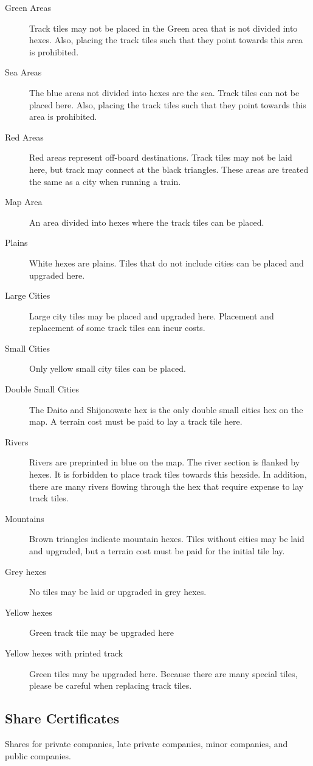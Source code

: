 \documentclass{article}
\begin{document}
\begin{CJK}{UTF8}{min}
\begin{multicols}{2}
\begin{description}
\item[Green Areas] Track tiles may not be placed in the Green area
  that is not divided into hexes. Also, placing the track tiles such
  that they point towards this area is prohibited.
\item[Sea Areas] The blue areas not divided into hexes are the
  sea. Track tiles can not be placed here. Also, placing the track
  tiles such that they point towards this area is prohibited.
\item[Red Areas] Red areas represent off-board destinations. Track
  tiles may not be laid here, but track may connect at the black
  triangles. These areas are treated the same as a city when running a
  train.
\item[Map Area] An area divided into hexes where the track
  tiles can be placed.
\item[Plains] White hexes are plains. Tiles that do not include cities
  can be placed and upgraded here.
\item[Large Cities] Large city tiles may be placed and upgraded
  here. Placement and replacement of some track tiles can incur costs.
\item[Small Cities] Only yellow small city tiles can be placed.
\item[Double Small Cities] The Daito and Shijonowate hex is the only
  double small cities hex on the map. A terrain cost must be paid to
  lay a track tile here.
\item[Rivers] Rivers are preprinted in blue on the map. The river
  section is flanked by hexes. It is forbidden to place track tiles
  towards this hexside. In addition, there are many rivers flowing
  through the hex that require expense to lay track tiles.
\item[Mountains] Brown triangles indicate mountain hexes. Tiles
  without cities may be laid and upgraded, but a terrain cost must be
  paid for the initial tile lay.
\item[Grey hexes] No tiles may be laid or upgraded in grey hexes.
\item[Yellow hexes] Green track tile may be upgraded here
\item[Yellow hexes with printed track] Green tiles may be upgraded
  here. Because there are many special tiles, please be careful when
  replacing track tiles.
\end{description}


\subsection{Share Certificates}
Shares for private companies, late private companies, minor companies, and
public companies.



\end{multicols}
\end{CJK}
\end{document}
